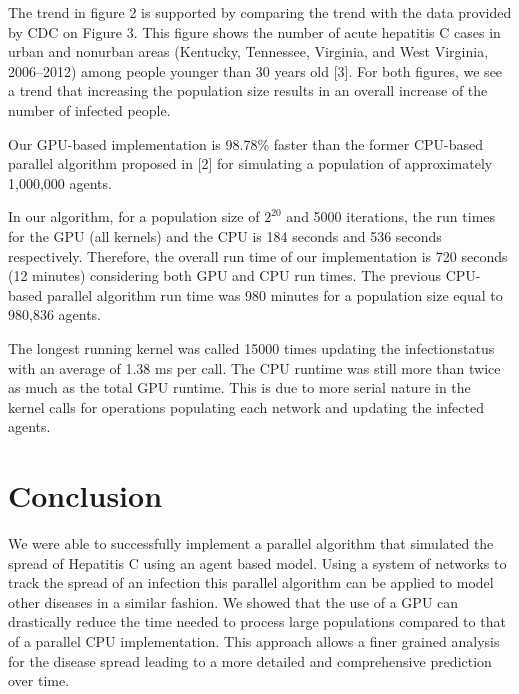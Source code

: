 \documentclass[conference]{IEEEtran}
\begin{document}

The trend in figure 2 is supported by comparing the trend with the data provided by CDC on Figure 3. This figure shows the number of acute hepatitis C cases in urban and nonurban areas (Kentucky, Tennessee, Virginia, and West Virginia, 2006–2012) among people younger than 30 years old [3]. For both figures, we see a trend that increasing the population size results in an overall increase of the number of infected people.\par



Our GPU-based implementation is 98.78\% faster than the former CPU-based parallel algorithm proposed in [2] for simulating a population of approximately 1,000,000 agents.\par
In our algorithm, for a population size of $2^{20}$ and 5000 iterations, the run times for the GPU (all kernels) and the CPU is 184 seconds and 536 seconds respectively. Therefore, the overall run time of our implementation is 720 seconds (12 minutes) considering both GPU and CPU run times. The previous CPU-based parallel algorithm run time was 980 minutes for a population size equal to 980,836 agents.\par
The longest running kernel was called 15000 times updating the infectionstatus with an average of 1.38 ms per call. The CPU runtime was still more than twice as much as the total GPU runtime. This is due to more serial nature in the kernel calls for operations populating each network and updating the infected agents.\par

\section{Conclusion}
We were able to successfully implement a parallel algorithm that simulated the spread of Hepatitis C using an agent based model. Using a system of networks to track the spread of an infection this parallel algorithm can be applied to model other diseases in a similar fashion.  We showed that the use of a GPU can drastically reduce the time needed to process large populations compared to that of a parallel CPU implementation. This approach allows a finer grained analysis for the disease spread leading to a more detailed and comprehensive prediction over time.\par



\end{document}
